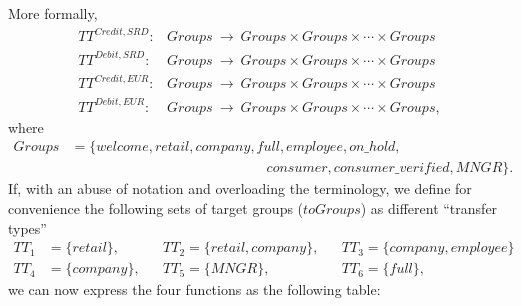 More formally,
\begin{align}
TT^{Credit,SRD}\colon &Groups\ \rightarrow\ Groups \times Groups \times \cdots \times Groups \\
TT^{Debit,SRD}\colon &Groups\ \rightarrow\ Groups \times Groups \times \cdots \times Groups \\
TT^{Credit,EUR}\colon &Groups\ \rightarrow\ Groups \times Groups \times \cdots \times Groups \\
TT^{Debit,EUR}\colon &Groups\ \rightarrow\ Groups \times Groups \times \cdots \times Groups,
\end{align}
where
\begin{align}
Groups &= \{ welcome, retail, company, full, employee, on\text{\_}hold,  \nonumber \\
		& \qquad\qquad\qquad\qquad\qquad\qquad\qquad
			consumer, consumer\text{\_}verified, MNGR \}.
\end{align}
If, with an abuse of notation and overloading the terminology, we define for convenience the following sets of target groups ($toGroups$) as different ``transfer types''
\begin{align*}
TT_1 &= \{ retail \},		&& TT_2 = \{ retail, company \},		&& TT_3 = \{ company, employee \} \\
TT_4 &= \{ company \},	&& TT_5 = \{ MNGR \},			&& TT_6 = \{ full \},
\end{align*}
we can now express the four functions as the following table:

